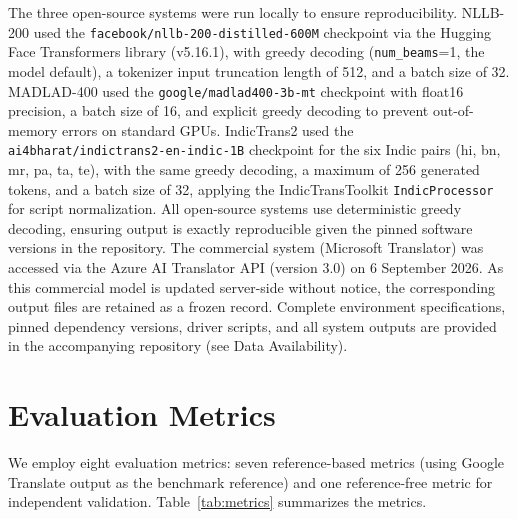 \documentclass[Afour,sagev,times,doublespace]{sagej}
\begin{document}
The three open-source systems were run locally to ensure reproducibility. NLLB-200 used the \texttt{facebook/nllb-200-distilled-600M} checkpoint via the Hugging Face Transformers library (v5.16.1), with greedy decoding (\texttt{num\_beams}=1, the model default), a tokenizer input truncation length of 512, and a batch size of 32. MADLAD-400 used the \texttt{google/madlad400-3b-mt} checkpoint with float16 precision, a batch size of 16, and explicit greedy decoding to prevent out-of-memory errors on standard GPUs. IndicTrans2 used the \texttt{ai4bharat/indictrans2-en-indic-1B} checkpoint for the six Indic pairs (hi, bn, mr, pa, ta, te), with the same greedy decoding, a maximum of 256 generated tokens, and a batch size of 32, applying the IndicTransToolkit \texttt{IndicProcessor} for script normalization. All open-source systems use deterministic greedy decoding, ensuring output is exactly reproducible given the pinned software versions in the repository. The commercial system (Microsoft Translator) was accessed via the Azure AI Translator API (version 3.0) on 6 September 2026. As this commercial model is updated server-side without notice, the corresponding output files are retained as a frozen record. Complete environment specifications, pinned dependency versions, driver scripts, and all system outputs are provided in the accompanying repository (see Data Availability).

\section{Evaluation Metrics}

We employ eight evaluation metrics: seven reference-based metrics (using Google Translate output as the benchmark reference) and one reference-free metric for independent validation. Table~\ref{tab:metrics} summarizes the metrics.
\end{document}
